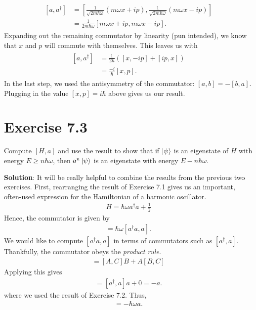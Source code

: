 \documentclass{book}
\begin{document}
    \begin{align}
    \begin{aligned}
        [a, a^\dagger] &= \left[\frac{1}{\sqrt{2m\hbar \omega}}\left(m\omega x + ip\right), \frac{1}{\sqrt{2m\hbar \omega}}\left(m\omega x - ip\right)\right] \\
        &= \frac{1}{2m\hbar \omega}\left[m\omega x + ip, m\omega x - ip\right].
    \end{aligned}
    \end{align}
    Expanding out the remaining commutator by linearity (pun intended), we know that $x$ and $p$ will commute with themselves. This leaves us with 
    \begin{align}
    \begin{aligned}
        [a, a^\dagger] &= \frac{1}{2\hbar} \left([x, -ip] + [ip,x]\right) \\
        &= \frac{-i}{\hbar}[x,p] .
    \end{aligned}
    \end{align}
    In the last step, we used the antisymmetry of the commutator: $[a,b] = -[b,a]$. Plugging in the value $[x,p] = i \hbar$ above gives us our result.

\section*{Exercise 7.3}
    Compute $[H, a]$ and use the result to show that if $\ket{\psi}$ is an eigenstate of $H$ with energy $E \geq n\hbar \omega$, then $a^n \ket{\psi}$ is an eigenstate with energy $E - n\hbar \omega$.

    \textbf{Solution}: It will be really helpful to combine the results from the previous two exercises. First, rearranging the result of Exercise 7.1 gives us an important, often-used expression for the Hamiltonian of a harmonic oscillator.
    \begin{align}
        H = \hbar \omega a^\dagger a + \frac{1}{2}
    \end{align}
    Hence, the commutator is given by
    \begin{align}
        [H, a] = \hbar \omega [a^\dagger a , a].
    \end{align}
    We would like to compute $[a^\dagger a, a]$ in terms of commutators such as $[a^\dagger, a]$. Thankfully, the commutator obeys the \emph{product rule}. 
    \begin{align}
        [AB, C] = [A, C]B + A[B,C]
    \end{align}
    Applying this gives
    \begin{align}
        [a^\dagger a, a] = [a^\dagger, a] a + 0 = -a.
    \end{align}
    where we used the result of Exercise 7.2. Thus,
    \begin{align}
        [H,a] = -\hbar\omega a.
    \end{align}
\end{document}
